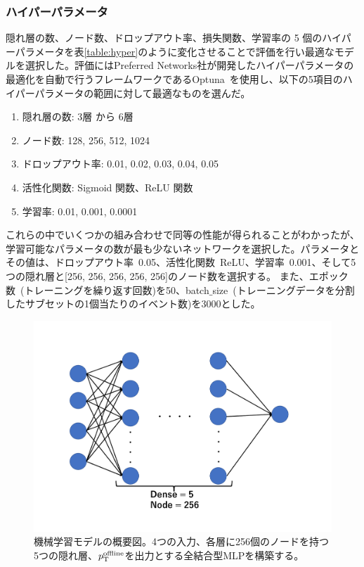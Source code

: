 \subsubsection{ハイパーパラメータ}
隠れ層の数、ノード数、ドロップアウト率、損失関数、学習率の 5 個のハイパーパラメータを表\ref{table:hyper}のように変化させることで評価を行い最適なモデルを選択した。評価にはPreferred Networks社が開発したハイパーパラメータの最適化を自動で行うフレームワークであるOptuna~\cite{article:optuna}を使用し、以下の5項目のハイパーパラメータの範囲に対して最適なものを選んだ。
\begin{enumerate}\label{table:hyper}
   \item 隠れ層の数: 3層 から 6層
   \item ノード数: 128, 256, 512, 1024
   \item ドロップアウト率: 0.01, 0.02, 0.03, 0.04, 0.05
   \item 活性化関数: Sigmoid 関数、ReLU 関数
   \item 学習率: 0.01, 0.001, 0.0001
\end{enumerate}
これらの中でいくつかの組み合わせで同等の性能が得られることがわかったが、学習可能なパラメータの数が最も少ないネットワークを選択した。パラメータとその値は、ドロップアウト率~0.05、活性化関数~ReLU、学習率~0.001、そして5つの隠れ層と[256, 256, 256, 256, 256]のノード数を選択する。
また、エポック数~(トレーニングを繰り返す回数)を50、batch$\_$size~(トレーニングデータを分割したサブセットの1個当たりのイベント数)を3000とした。

\begin{figure}[tb]
  \centering
  \includegraphics[clip, width=12cm]{fig/4/MLP_3.pdf}
  \caption{機械学習モデルの概要図。4つの入力、各層に256個のノードを持つ5つの隠れ層、$p_{\rm{T}}^{\rm{offline}}$を出力とする全結合型MLPを構築する。}
  \label{fig:MLP_overview}
\end{figure}


